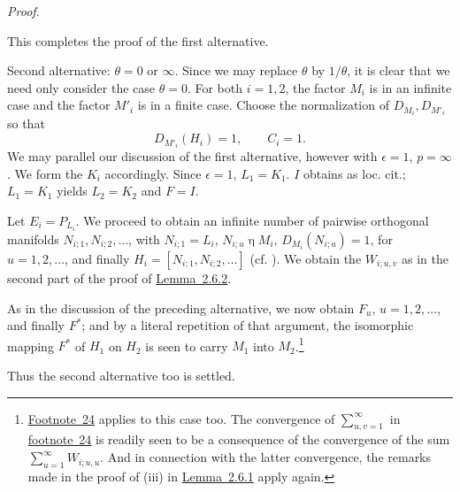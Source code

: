 \documentclass[b5paper,twoside]{article}
\newcommand{\lemref}[2]{\hyperref[#1]{\mbox{Lemma~#2}}}
\theoremstyle{mvnplain}
\renewenvironment{proof}[1][Proof]{%
  \par\addvspace{0.35\baselineskip}%
  \noindent\textit{#1.}\ \normalfont\ignorespaces
}{%
  \par\addvspace{0.35\baselineskip}%
}
\newcommand{\M}{\mathbf M}
\newcommand{\Hilbert}{\mathfrak H}
\def\M{M}%
\def\Hilbert{H}%
\def\mathfrak#1{#1}%
\begin{document}
\begin{proof}
This completes the proof of the first alternative.

Second alternative: \(\theta=0\) or \(\infty\). Since we may replace
\(\theta\) by \(1/\theta\), it is clear that we need only consider the case
\(\theta=0\). For both \(i=1,2\), the factor \(\M_i\) is in an infinite
case and the factor \(\M'_i\) is in a finite case. Choose the normalization of
\(D_{\M_i},D_{\M'_i}\) so that
\[
  D_{\M'_i}(\Hilbert_i)=1,\qquad C_i=1.
\]
We may parallel our discussion of the first alternative, however with
\(\epsilon=1\), \(p=\infty\). We form the \(\mathfrak K_i\) accordingly.
Since \(\epsilon=1\), \(\mathfrak L_1=\mathfrak K_1\).
\(\mathfrak I\) obtains as loc. cit.; \(\mathfrak L_1=\mathfrak K_1\) yields
\(\mathfrak L_2=\mathfrak K_2\) and \(\mathfrak F=\mathfrak I\).

Let \(E_i=P_{\mathfrak L_i}\). We proceed to obtain an infinite number of
pairwise orthogonal manifolds
\(\mathfrak N_{i;1},\mathfrak N_{i;2},\ldots\), with
\(\mathfrak N_{i;1}=\mathfrak L_i\),
\(\mathfrak N_{i;u}\mathrel{\eta}\M_i\),
\(D_{\M_i}(\mathfrak N_{i;u})=1\), for \(u=1,2,\ldots\), and finally
\(\Hilbert_i=[\mathfrak N_{i;1},\mathfrak N_{i;2},\ldots]\) (cf.
\cite[p.~155, Lemma~7.1.2]{ref5}). We obtain the \(W_{i;u,v}\) as in the
second part of the proof of \lemref{lem:2.6.2}{2.6.2}.

As in the discussion of the preceding alternative, we now obtain
\(\mathfrak F_u\), \(u=1,2,\ldots\), and finally \(\mathfrak F^*\); and by
a literal repetition of that argument, the isomorphic mapping
\(\mathfrak F^*\) of \(\Hilbert_1\) on \(\Hilbert_2\) is seen to carry
\(\M_1\) into \(\M_2\).\footnote{\hyperlink{fn:24}{Footnote~24} applies to this case too. The
convergence of \(\sum_{u,v=1}^{\infty}\) in
\hyperlink{fn:24}{footnote~24} is readily seen to
be a consequence of the convergence of the sum
\(\sum_{u=1}^{\infty}W_{i;u,u}\). And in connection with the latter
convergence, the remarks made in the proof of (iii) in
\lemref{lem:2.6.1}{2.6.1} apply again.}

Thus the second alternative too is settled.


\end{proof}
\end{document}
